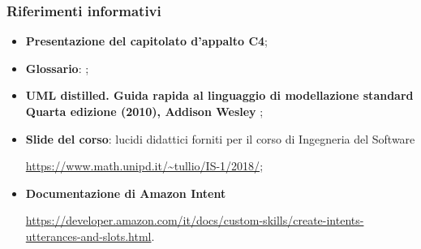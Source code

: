 \subsubsection{Riferimenti informativi}
\begin{itemize}
\item \textbf{Presentazione del capitolato d'appalto C4};
\item \textbf{Glossario}: \docNameVersionGlo{};
\item \textbf{UML distilled. Guida rapida al linguaggio di modellazione standard Quarta edizione (2010), Addison Wesley };
\item \textbf{Slide del corso}: lucidi didattici forniti per il corso di Ingegneria del Software

\url{https://www.math.unipd.it/~tullio/IS-1/2018/};
\item \textbf{Documentazione di Amazon Intent}

\url{https://developer.amazon.com/it/docs/custom-skills/create-intents-utterances-and-slots.html}.
\end{itemize}

